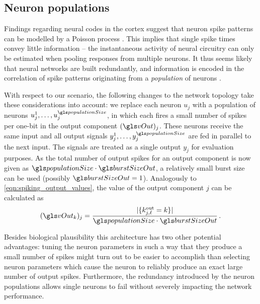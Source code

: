 \subsection{Neuron populations}
\label{sec:neuron_populations}

Findings regarding neural codes in the cortex suggest that neuron spike patterns can be modelled by a Poisson process \cite{softky1993highly}. This implies that single spike times convey little information -- the instantaneous activity of neural circuitry can only be estimated when pooling responses from multiple neurons. It thus seems likely that neural networks are built redundantly, and information is encoded in the correlation of spike patterns originating from a \emph{population} of neurons \cite{shadlen1994noise}.

With respect to our scenario, the following changes to the network topology take these considerations into account: we replace each neuron $u_j$ with a population of \populationSize neurons $u_j^1, \ldots, u_j^{\populationSize}$, in which each fires a small number of \burstSizeOut spikes per one-bit in the output component $(\vOut)_j$. These neurons receive the same input and all output signals $y_j^1, \ldots, y_j^{\populationSize}$ are fed in parallel to the next input. The signals are treated as a single output $y_j$ for evaluation purposes. As the total number of output spikes for an output component is now given as $\populationSize \cdot \burstSizeOut$, a relatively small burst size can be used (possibly $\burstSizeOut = 1$). Analogously to \cref{eqn:spiking_output_values}, the value of the output component $j$ can be calculated as
\begin{align}
	(\vOut_k)_j = \frac{| \{k^{\mathrm{out}}_{j, \ell} = k\} |}{\populationSize \cdot \burstSizeOut} \,.
	\label{eqn:spiking_output_values_population}
\end{align}

Besides biological plausibility this architecture has two other potential advantages: tuning the neuron parameters in such a way that they produce a small number of spikes might turn out to be easier to accomplish than selecting neuron parameters which cause the neuron to reliably produce an exact large number of output spikes. Furthermore, the redundancy introduced by the neuron populations allows single neurons to fail without severely impacting the network performance.

